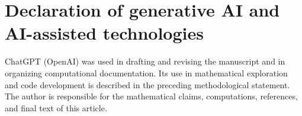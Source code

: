 \section*{Declaration of generative AI and AI-assisted technologies}

ChatGPT (OpenAI) was used in drafting and revising the manuscript and in
organizing computational documentation. Its use in mathematical
exploration and code development is described in the preceding
methodological statement. The author is responsible for the mathematical
claims, computations, references, and final text of this article.
